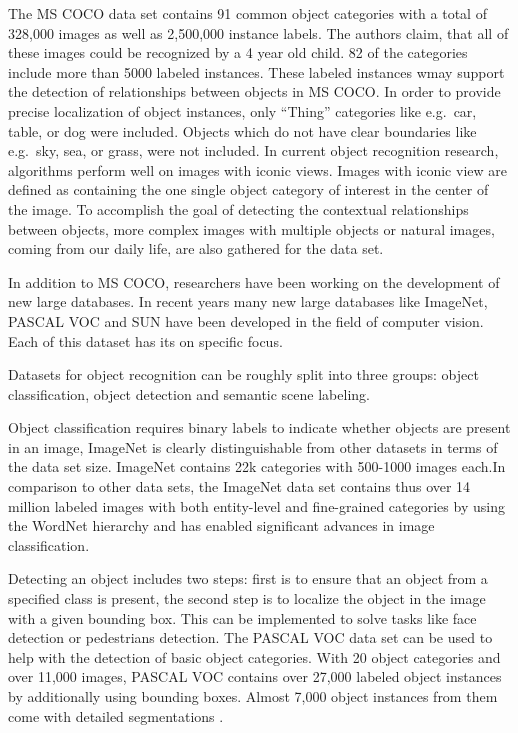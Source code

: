 \documentclass[
]{krantz}
\begin{document}
The MS COCO data set contains 91 common object categories with a total of 328,000 images as well as 2,500,000 instance labels. The authors claim, that all of these images could be recognized by a 4 year old child. 82 of the categories include more than 5000 labeled instances. These labeled instances wmay support the detection of relationships between objects in MS COCO. In order to provide precise localization of object instances, only ``Thing'' categories like e.g.~car, table, or dog were included. Objects which do not have clear boundaries like e.g.~sky, sea, or grass, were not included. In current object recognition research, algorithms perform well on images with iconic views. Images with iconic view are defined as containing the one single object category of interest in the center of the image. To accomplish the goal of detecting the contextual relationships between objects, more complex images with multiple objects or natural images, coming from our daily life, are also gathered for the data set.

In addition to MS COCO, researchers have been working on the development of new large databases. In recent years many new large databases like ImageNet, PASCAL VOC \citep{pascalvoc} and SUN \citep{sun} have been developed in the field of computer vision. Each of this dataset has its on specific focus.

Datasets for object recognition can be roughly split into three groups: object classification, object detection and semantic scene labeling.

Object classification requires binary labels to indicate whether objects are present in an image, ImageNet \citep{deng2009imagenet} is clearly distinguishable from other datasets in terms of the data set size. ImageNet contains 22k categories with 500-1000 images each.In comparison to other data sets, the ImageNet data set contains thus over 14 million labeled images with both entity-level and fine-grained categories by using the WordNet hierarchy and has enabled significant advances in image classification.

Detecting an object includes two steps: first is to ensure that an object from a specified class is present, the second step is to localize the object in the image with a given bounding box. This can be implemented to solve tasks like face detection or pedestrians detection. The PASCAL VOC \citep{pascalvoc} data set can be used to help with the detection of basic object categories. With 20 object categories and over 11,000 images, PASCAL VOC contains over 27,000 labeled object instances by additionally using bounding boxes. Almost 7,000 object instances from them come with detailed segmentations \citep{mccoco}.
\end{document}
